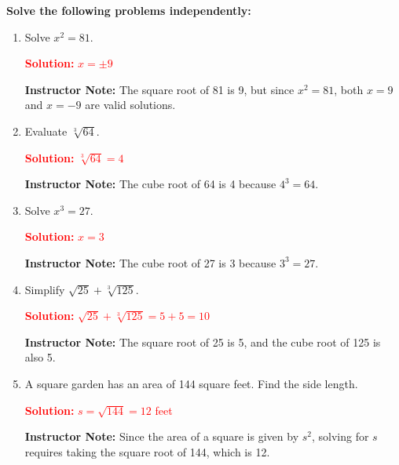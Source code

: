 \documentclass[12pt]{article}
\begin{document}
\begin{tcolorbox}[colframe=black!60, colback=white, 
coltitle=black, colbacktitle=black!15, fonttitle=\bfseries\Large, 
title=Independent Practice (Instructor Version), halign title=center, left=10pt, right=10pt, top=10pt, bottom=15pt]
\textbf{Solve the following problems independently:}
\begin{enumerate}[itemsep=1em]
    \item Solve $x^2 = 81$.
    
    \textcolor{red}{\textbf{Solution:}}
    \textcolor{red}{$ x = \pm 9 $}
    
    \textbf{Instructor Note:} The square root of 81 is 9, but since $x^2 = 81$, both $x = 9$ and $x = -9$ are valid solutions.
    
    \item Evaluate $\sqrt[3]{64}$.
    
    \textcolor{red}{\textbf{Solution:}}
    \textcolor{red}{$ \sqrt[3]{64} = 4 $}
    
    \textbf{Instructor Note:} The cube root of 64 is 4 because $4^3 = 64$.
    
    \item Solve $x^3 = 27$.
    
    \textcolor{red}{\textbf{Solution:}}
    \textcolor{red}{$ x = 3 $}
    
    \textbf{Instructor Note:} The cube root of 27 is 3 because $3^3 = 27$.
    
    \item Simplify $\sqrt{25} + \sqrt[3]{125}$.
    
    \textcolor{red}{\textbf{Solution:}}
    \textcolor{red}{$ \sqrt{25} + \sqrt[3]{125} = 5 + 5 = 10 $}
    
    \textbf{Instructor Note:} The square root of 25 is 5, and the cube root of 125 is also 5.
    
    \item A square garden has an area of 144 square feet. Find the side length.
    
    \textcolor{red}{\textbf{Solution:}}
    \textcolor{red}{$ s = \sqrt{144} = 12 $ feet}
    
    \textbf{Instructor Note:} Since the area of a square is given by $s^2$, solving for $s$ requires taking the square root of 144, which is 12.
\end{enumerate}
\end{tcolorbox}
\end{document}
